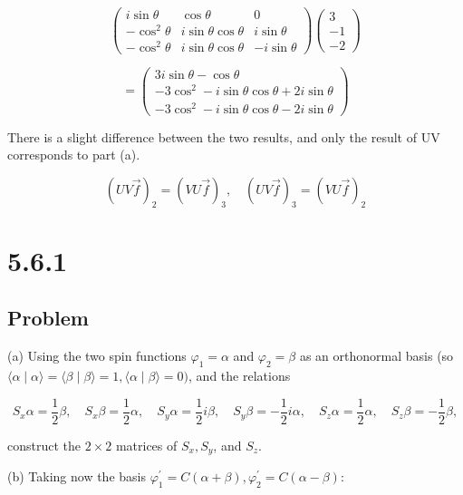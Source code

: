 \documentclass[12pt]{article}
\begin{document}
\[
    \begin{pmatrix}
        i \sin \theta  & \cos \theta               & 0              \\
        -\cos^2 \theta & i \sin \theta \cos \theta & i \sin \theta  \\
        -\cos^2 \theta & i \sin \theta \cos \theta & -i \sin \theta
    \end{pmatrix}
    \begin{pmatrix}
        3  \\
        -1 \\
        -2
    \end{pmatrix}
\]

\[
    = \begin{pmatrix}
        3 i \sin \theta - \cos \theta                           \\
        -3 \cos^2 - i \sin \theta \cos \theta + 2 i \sin \theta \\
        -3 \cos^2 - i \sin \theta \cos \theta - 2 i \sin \theta
    \end{pmatrix}
\]

There is a slight difference between the two results, and only the result of UV corresponds to part (a).

\[
    {\left(UV\vec{f}\right)} _2 = {\left(VU\vec{f}\right)} _3, \quad {\left(UV\vec{f}\right)} _3 = {\left(VU\vec{f}\right)} _2
\]


\newpage
\section{5.6.1}

\subsection{Problem}

(a) Using the two spin functions \(\varphi_1=\alpha\) and \(\varphi_2=\beta\) as an orthonormal basis (so \(\langle\alpha \mid \alpha\rangle=\langle\beta \mid \beta\rangle=1,\langle\alpha \mid \beta\rangle=0)\), and the relations

\[
    S_x \alpha=\frac{1}{2} \beta, \quad S_x \beta=\frac{1}{2} \alpha, \quad S_y \alpha=\frac{1}{2} i \beta, \quad S_y \beta=-\frac{1}{2} i \alpha, \quad S_z \alpha=\frac{1}{2} \alpha, \quad S_z \beta=-\frac{1}{2} \beta,
\]

construct the \(2 \times 2\) matrices of \(S_x, S_y\), and \(S_z\).

(b) Taking now the basis \(\varphi_1^{\prime}=C(\alpha+\beta), \varphi_2^{\prime}=C(\alpha-\beta)\):
\end{document}
